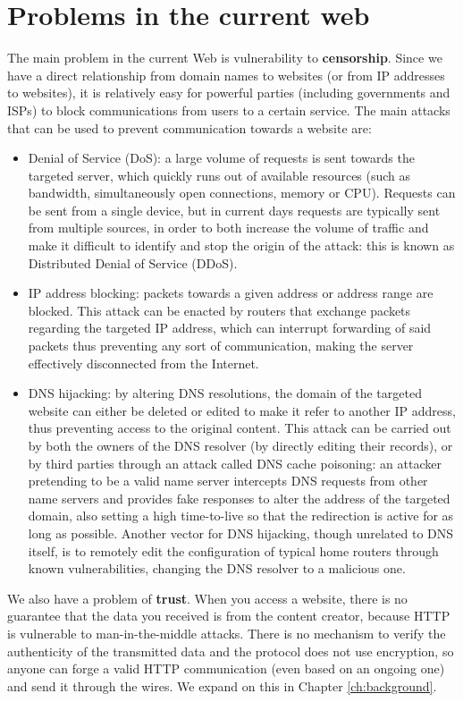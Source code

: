 \documentclass[mscthesis]{usiinfthesis}
\begin{document}
\section{Problems in the current web} \label{sec:problems}
The main problem in the current Web is vulnerability to \textbf{censorship}. Since we have a direct relationship from domain names to websites (or from IP addresses to websites), it is relatively easy for powerful parties (including governments and ISPs) to block communications from users to a certain service.
The main attacks that can be used to prevent communication towards a website are:
\begin{itemize}
	\item Denial of Service (DoS): a large volume of requests is sent towards the targeted server, which quickly runs out of available resources (such as bandwidth, simultaneously open connections, memory or CPU). Requests can be sent from a single device, but in current days requests are typically sent from multiple sources, in order to both increase the volume of traffic and make it difficult to identify and stop the origin of the attack: this is known as Distributed Denial of Service (DDoS).
	\item IP address blocking: packets towards a given address or address range are blocked. This attack can be enacted by routers that exchange packets regarding the targeted IP address, which can interrupt forwarding of said packets thus preventing any sort of communication, making the server effectively disconnected from the Internet.
	\item DNS hijacking: by altering DNS resolutions, the domain of the targeted website can either be deleted or edited to make it refer to another IP address, thus preventing access to the original content. This attack can be carried out by both the owners of the DNS resolver (by directly editing their records), or by third parties through an attack called DNS cache poisoning: an attacker pretending to be a valid name server intercepts DNS requests from other name servers and provides fake responses to alter the address of the targeted domain, also setting a high time-to-live so that the redirection is active for as long as possible. Another vector for DNS hijacking, though unrelated to DNS itself, is to remotely edit the configuration of typical home routers through known vulnerabilities, changing the DNS resolver to a malicious one.
\end{itemize}

We also have a problem of \textbf{trust}. When you access a website, there is no guarantee that the data you received is from the content creator, because HTTP is vulnerable to man-in-the-middle attacks. There is no mechanism to verify the authenticity of the transmitted data and the protocol does not use encryption, so anyone can forge a valid HTTP communication (even based on an ongoing one) and send it through the wires. We expand on this in Chapter \ref{ch:background}.
\end{document}
